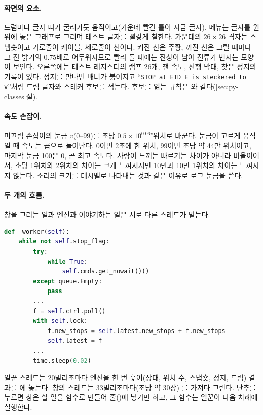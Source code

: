 \paragraph{화면의 요소.} 드럼마다 글자 띠가 굴러가듯 움직이고(가운데 빨간 틀이 지금 글자), 메뉴는 글자를 원 위에
놓은 그래프로 그리며 테스트 글자를 빨갛게 칠한다. 가운데의 $26\times26$ 격자는 스냅숏이고 가로줄이 케이블, 세로줄이
선이다. 켜진 선은 주황, 꺼진 선은 그릴 때마다 그 전 밝기의 0.75배로 어두워지므로 빨리 돌 때에는 잔상이 남아 전류가
번지는 모양이 보인다. 오른쪽에는 테스트 레지스터의 램프 26개, 잰 속도, 진행 막대, 찾은 정지의 기록이 있다. 정지를
만나면 배너가 붉어지고 ``\texttt{STOP at ETD   E is steckered to V}''처럼 드럼 글자와 스테커 후보를 적는다. 후보를 읽는
규칙은 와 같다(\ref{sec:py-classes}절).

\paragraph{속도 손잡이.} 미끄럼 손잡이의 눈금 $v$($0$--$99$)를 초당 $0.5\times10^{0.06v}$위치로 바꾼다. 눈금이
고르게 움직일 때 속도는 곱으로 늘어난다. 0이면 2초에 한 위치, 99이면 초당 약 44만 위치이고, 마지막 눈금 100은
 0, 곧 최고 속도다. 사람이 느끼는 빠르기는 차이가 아니라 비율이어서, 초당 1위치와 2위치의 차이는 크게
느껴지지만 10만과 10만 1위치의 차이는 느껴지지 않는다. 소리의 크기를 데시벨로 나타내는 것과 같은 이유로 로그
눈금을 쓴다.

\paragraph{두 개의 흐름.} 창을 그리는 일과 엔진과 이야기하는 일은 서로 다른 스레드가 맡는다.

\begin{lstlisting}[language=Python,caption={\code{visual.py}: 일꾼 스레드(일부).},label={lst:h-worker}]
def _worker(self):
    while not self.stop_flag:
        try:
            while True:
                self.cmds.get_nowait()()
        except queue.Empty:
            pass
        ...
        f = self.ctrl.poll()
        with self.lock:
            f.new_stops = self.latest.new_stops + f.new_stops
            self.latest = f
        ...
        time.sleep(0.02)
\end{lstlisting}

일꾼 스레드는 20밀리초마다 엔진을 한 번 훑어(상태, 위치 수, 스냅숏, 정지, 드럼) 결과를 에 놓는다.
창의 스레드는 33밀리초마다(초당 약 30장) 를 가져다 그린다. 단추를 누르면 창은 할 일을 함수로 만들어
줄()에 넣기만 하고, 그 함수는 일꾼이 다음 차례에 실행한다.

